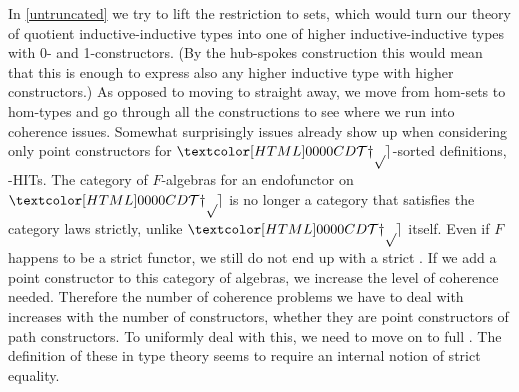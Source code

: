In \cref{untruncated} we try to lift the restriction to sets, which
would turn our theory of quotient inductive-inductive types into one
of higher inductive-inductive types with 0- and 1-constructors. (By
the hub-spokes construction this would mean that this is enough to
express also any higher inductive type with higher constructors.) As
opposed to moving to \inftycats straight away, we move from hom-sets
to hom-types and go through all the constructions to see where we run
into coherence issues. Somewhat surprisingly issues already show up
when considering only point constructors for $\TYPE$-sorted
definitions, -HITs. The category of $F$-algebras for an
endofunctor on $\TYPE$ is no longer a category that satisfies the
category laws strictly, unlike $\TYPE$ itself. Even if $F$ happens to
be a strict functor, we still do not end up with a strict
\inftycat. If we add a point constructor to this category of algebras,
we increase the level of coherence needed. Therefore the number of
coherence problems we have to deal with increases with the number of
constructors, whether they are point constructors of path
constructors. To uniformly deal with this, we need to move on to full
\inftycats. The definition of these in type theory seems to require an
internal notion of strict equality.





